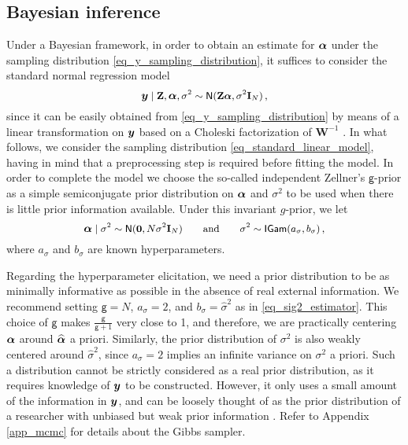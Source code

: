 \documentclass[letterpaper,10pt,openany]{article}
\def\I{\mathbf{I}}\def\i{\mathbf{i}}\def\Iv{\boldsymbol{I}}\def\iv{\boldsymbol{i}}
\def\W{\mathbf{W}}\def\w{\mathbf{w}}\def\Wv{\boldsymbol{W}}\def\wv{\boldsymbol{w}}
\def\Z{\mathbf{Z}}\def\z{\mathbf{z}}\def\Zv{\boldsymbol{Z}}\def\zv{\boldsymbol{z}}
\def\sig{\sigma}\def\sigv{\boldsymbol{\sigma}}
\def\Nor{\small{\mathsf{N}}}
\def\IGamd{\small{\mathsf{IGam}}}
\def\zerov{\boldsymbol{0}}
\begin{document}
\subsection{Bayesian inference}\label{sec_bayesian_inference}


Under a Bayesian framework, in order to obtain an estimate for $\boldsymbol{\alpha}$ under the sampling distribution \eqref{eq_y_sampling_distribution}, it suffices to consider the standard normal regression model  
\begin{equation}\label{eq_standard_linear_model}
\yv\mid\Z,\alv,\sig^2\sim\Nor(\Z\alv,\sig^2\I_N)\,,
\end{equation}
since it can be easily obtained from \eqref{eq_y_sampling_distribution} by means of a linear transformation on $\boldsymbol{y}$ based on a Choleski factorization of $\W^{-1}$ \citep[see][for details]{faraway-2014-linear}. In what follows, we consider the sampling distribution \eqref{eq_standard_linear_model}, having in mind that a preprocessing step is required before fitting the model. In order to complete the model we choose the so-called independent Zellner's $\textsf{g}$-prior as a simple semiconjugate prior distribution on $\boldsymbol{\alpha}$ and $\sigma^2$ to be used when there is little prior information available. Under this invariant $g$-prior, we let
$$
\alv \mid \sig^2 \sim \Nor(\zerov,N\sig^2\I_N)
\qquad\text{and}\qquad
\sig^2 \sim \IGamd(a_\sig,b_\sig)\,,
$$
where $a_\sig$ and $b_\sig$ are known hyperparameters.


Regarding the hyperparameter elicitation, we need a prior distribution to be as minimally informative as possible in the absence of real external information. We recommend setting $\textsf{g} = N$, $a_\sig = 2$, and $b_\sig = \widehat\sigma^2$ as in \eqref{eq_sig2_estimator}. This choice of $\textsf{g}$ makes $\tfrac{\textsf{g}}{\textsf{g}+1}$ very close to 1, and therefore, we are practically centering $\boldsymbol{\alpha}$ around $\widehat{\boldsymbol{\alpha}}$ a priori. Similarly, the prior distribution of $\sigma^2$ is also weakly centered around $\widehat\sig^2$, since $a_\sig=2$ implies an infinite variance on $\sig^2$ a priori.  Such a distribution cannot be strictly considered as a real prior distribution, as it requires knowledge of $\boldsymbol{y}$ to be constructed. However, it only uses a small amount of the information in $\boldsymbol{y}$, and can be loosely thought of as the prior distribution of a researcher with unbiased but weak prior information \citep[see][for a discussion]{hoff-2009-first}. Refer to Appendix \ref{app_mcmc} for details about the Gibbs sampler.
\end{document}
